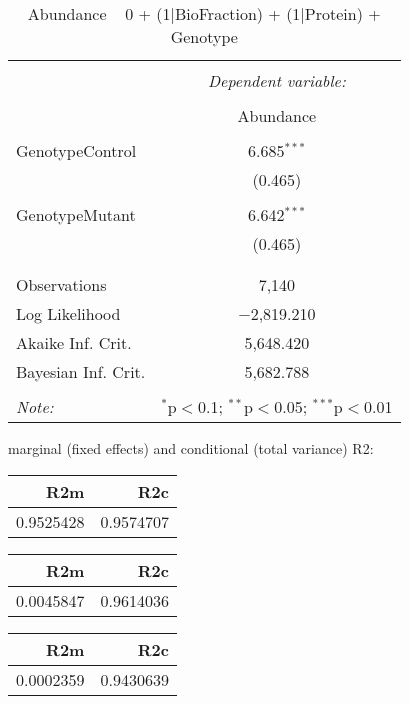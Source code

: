 \documentclass[11pt]{report}
\begin{document}
\begin{table}[!htbp] \centering 
  \caption{Abundance ~ 0 + (1|BioFraction) + (1|Protein) + Genotype} 
  \label{} 
\begin{tabular}{@{\extracolsep{5pt}}lc} 
\\[-1.8ex]\hline 
\hline \\[-1.8ex] 
 & \multicolumn{1}{c}{\textit{Dependent variable:}} \\ 
\cline{2-2} 
\\[-1.8ex] & Abundance \\ 
\hline \\[-1.8ex] 
 GenotypeControl & 6.685$^{***}$ \\ 
  & (0.465) \\ 
  & \\ 
 GenotypeMutant & 6.642$^{***}$ \\ 
  & (0.465) \\ 
  & \\ 
\hline \\[-1.8ex] 
Observations & 7,140 \\ 
Log Likelihood & $-$2,819.210 \\ 
Akaike Inf. Crit. & 5,648.420 \\ 
Bayesian Inf. Crit. & 5,682.788 \\ 
\hline 
\hline \\[-1.8ex] 
\textit{Note:}  & \multicolumn{1}{r}{$^{*}$p$<$0.1; $^{**}$p$<$0.05; $^{***}$p$<$0.01} \\ 
\end{tabular} 
\end{table} 
marginal (fixed effects) and conditional (total variance) R2:

\begin{tabular}{r|r}
\hline
R2m & R2c\\
\hline
0.9525428 & 0.9574707\\
\hline
\end{tabular}

\begin{tabular}{r|r}
\hline
R2m & R2c\\
\hline
0.0045847 & 0.9614036\\
\hline
\end{tabular}

\begin{tabular}{r|r}
\hline
R2m & R2c\\
\hline
0.0002359 & 0.9430639\\
\hline
\end{tabular}
\end{document}

